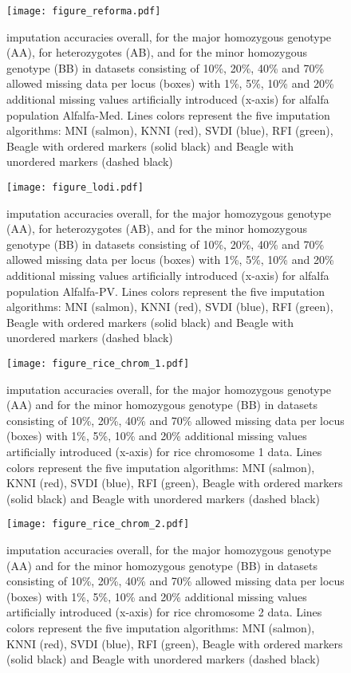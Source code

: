 \begin{figure}\texttt{[image: figure\_reforma.pdf]}\caption{
imputation accuracies overall, for the major homozygous genotype (AA), for heterozygotes (AB), and for the minor homozygous genotype (BB) in datasets consisting of
10\%, 20\%, 40\% and 70\% allowed missing data per locus (boxes) with 1\%, 5\%, 10\% and 20\%
additional missing values artificially introduced (x-axis) for alfalfa population Alfalfa-Med.
Lines colors represent the five imputation algorithms: MNI (salmon), KNNI (red), SVDI (blue), RFI (green), Beagle with ordered markers (solid black) and Beagle with unordered markers (dashed black)}\end{figure}

\begin{figure}\texttt{[image: figure\_lodi.pdf]}\caption{
imputation accuracies overall, for the major homozygous genotype (AA), for heterozygotes (AB), and for the minor homozygous genotype (BB) in datasets consisting of
10\%, 20\%, 40\% and 70\% allowed missing data per locus (boxes) with 1\%, 5\%, 10\% and 20\%
additional missing values artificially introduced (x-axis) for alfalfa population Alfalfa-PV.
Lines colors represent the five imputation algorithms: MNI (salmon), KNNI (red), SVDI (blue), RFI (green), Beagle with ordered markers (solid black) and Beagle with unordered markers (dashed black)}\end{figure}

\begin{figure}\texttt{[image: figure\_rice\_chrom\_1.pdf]}\caption{
imputation accuracies overall, for the major homozygous genotype (AA) and for the minor homozygous genotype (BB) in datasets consisting of
10\%, 20\%, 40\% and 70\% allowed missing data per locus (boxes) with 1\%, 5\%, 10\% and 20\%
additional missing values artificially introduced (x-axis) for rice chromosome 1 data.
Lines colors represent the five imputation algorithms: MNI (salmon), KNNI (red), SVDI (blue), RFI (green), Beagle with ordered markers (solid black) and Beagle with unordered markers (dashed black)}\end{figure}

\begin{figure}\texttt{[image: figure\_rice\_chrom\_2.pdf]}\caption{
imputation accuracies overall, for the major homozygous genotype (AA) and for the minor homozygous genotype (BB) in datasets consisting of
10\%, 20\%, 40\% and 70\% allowed missing data per locus (boxes) with 1\%, 5\%, 10\% and 20\%
additional missing values artificially introduced (x-axis) for rice chromosome 2 data.
Lines colors represent the five imputation algorithms: MNI (salmon), KNNI (red), SVDI (blue), RFI (green), Beagle with ordered markers (solid black) and Beagle with unordered markers (dashed black)}\end{figure}

